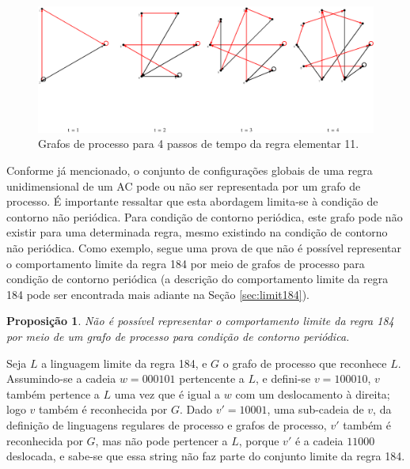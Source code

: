 \documentclass[12pt,a4paper]{article}
\newtheorem{proposition}[theorem]{Proposição}
\newenvironment{proof}[1][Prova]{\begin{trivlist}
\item[\hskip \labelsep {\bfseries #1}]}{\end{trivlist}}
\begin{document}
\begin{figure}[htp]
\begin{center}
\includegraphics[scale=0.5]{img/Rule11.eps}
\caption{Grafos de processo para 4 passos de tempo da regra elementar 11.}
\label{fig:r11t}
\end{center}
\end{figure}

Conforme já mencionado, o conjunto de configurações globais de uma regra
unidimensional de um AC pode ou não ser representada por um grafo de
processo. É importante ressaltar que esta abordagem limita-se à condição
de contorno não periódica. Para condição de contorno periódica, este grafo
pode não existir para uma determinada regra, mesmo existindo na condição de
contorno não periódica. Como exemplo, segue uma prova de que não é possível
representar o comportamento limite da regra 184 por meio de grafos de processo
para condição de contorno periódica (a descrição do comportamento limite da
regra 184 pode ser encontrada mais adiante na Seção \ref{sec:limit184}).

\begin{proposition}
Não é possível representar o comportamento limite da regra 184 por meio de
um grafo de processo para condição de contorno periódica.
\end{proposition}

\begin{proof}
Seja $L$ a linguagem limite da regra 184, e $G$
o grafo de processo que reconhece $L$. Assumindo-se a
cadeia $w = 000101$ pertencente a $L$, e defini-se $v = 100010$,
$v$ também pertence a $L$ uma vez que é igual
a $w$ com um deslocamento à direita; logo $v$ também é reconhecida por $G$.
Dado $v' = 10001$, uma sub-cadeia de $v$, da definição de
linguagens regulares de processo e grafos de processo, $v'$ também é
reconhecida por $G$, mas não pode pertencer a $L$, porque $v'$ é
a cadeia $11000$ deslocada, e sabe-se que essa string não
faz parte do conjunto limite da regra 184.
\end{proof}
\end{document}
